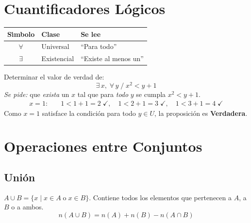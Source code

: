 \section{Cuantificadores L\'ogicos}

\begin{cajaformula}
  \begin{center}
  \renewcommand{\arraystretch}{1.4}
  \begin{tabular}{@{}cll@{}}
    \toprule
    \rowcolor{AzulClaro!60}
    \textbf{S\'{\i}mbolo} & \textbf{Clase} & \textbf{Se lee} \\
    \midrule
    $\forall$ & Universal & ``Para todo'' \\
    $\exists$ & Existencial & ``Existe al menos un'' \\
    \bottomrule
  \end{tabular}
  \end{center}
\end{cajaformula}

\begin{cajaejemplo}[3 --- Cuantificadores con $U = \{1, 2, 3\}$]
  Determinar el valor de verdad de:
  \[
    \exists\, x,\; \forall\, y \;/\; x^{2} < y + 1
  \]
  \noindent\textit{Se pide:} que \emph{exista} un $x$ tal que para
  \emph{todo} $y$ se cumpla $x^{2} < y + 1$.
  \begin{align*}
    x = 1: &\quad 1 < 1+1=2 \;\checkmark,\quad 1 < 2+1=3\;\checkmark,\quad
              1 < 3+1=4\;\checkmark
  \end{align*}
  Como $x = 1$ satisface la condición para todo $y \in U$, la proposición
  es \textbf{Verdadera}.
\end{cajaejemplo}

\section{Operaciones entre Conjuntos}

\subsection{Uni\'on}

\begin{cajadef}
  $A \cup B = \{x \mid x \in A \;\text{o}\; x \in B\}$. Contiene todos los
  elementos que pertenecen a $A$, a $B$ o a ambos.
  \[
    n(A \cup B) = n(A) + n(B) - n(A \cap B)
  \]
\end{cajadef}

